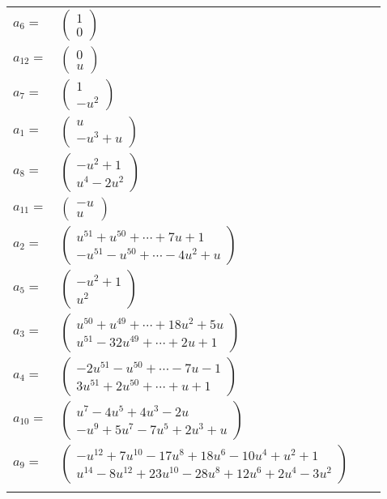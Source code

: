 \documentclass[1p]{elsarticle_modified}
\theoremstyle{definition}
\begin{document}
\begin{tabular}{m{7pt} m{180pt} m{7pt} m{180pt} }
\flushright $a_{6}=$&$\begin{pmatrix}1\\0\end{pmatrix}$ \\
\flushright $a_{12}=$&$\begin{pmatrix}0\\u\end{pmatrix}$ \\
\flushright $a_{7}=$&$\begin{pmatrix}1\\- u^2\end{pmatrix}$ \\
\flushright $a_{1}=$&$\begin{pmatrix}u\\- u^3+u\end{pmatrix}$ \\
\flushright $a_{8}=$&$\begin{pmatrix}- u^2+1\\u^4-2 u^2\end{pmatrix}$ \\
\flushright $a_{11}=$&$\begin{pmatrix}- u\\u\end{pmatrix}$ \\
\flushright $a_{2}=$&$\begin{pmatrix}u^{51}+u^{50}+\cdots+7 u+1\\- u^{51}- u^{50}+\cdots-4 u^2+u\end{pmatrix}$ \\
\flushright $a_{5}=$&$\begin{pmatrix}- u^2+1\\u^2\end{pmatrix}$ \\
\flushright $a_{3}=$&$\begin{pmatrix}u^{50}+u^{49}+\cdots+18 u^2+5 u\\u^{51}-32 u^{49}+\cdots+2 u+1\end{pmatrix}$ \\
\flushright $a_{4}=$&$\begin{pmatrix}-2 u^{51}- u^{50}+\cdots-7 u-1\\3 u^{51}+2 u^{50}+\cdots+u+1\end{pmatrix}$ \\
\flushright $a_{10}=$&$\begin{pmatrix}u^7-4 u^5+4 u^3-2 u\\- u^9+5 u^7-7 u^5+2 u^3+u\end{pmatrix}$ \\
\flushright $a_{9}=$&$\begin{pmatrix}- u^{12}+7 u^{10}-17 u^8+18 u^6-10 u^4+u^2+1\\u^{14}-8 u^{12}+23 u^{10}-28 u^8+12 u^6+2 u^4-3 u^2\end{pmatrix}$\\&\end{tabular}
\end{document}

